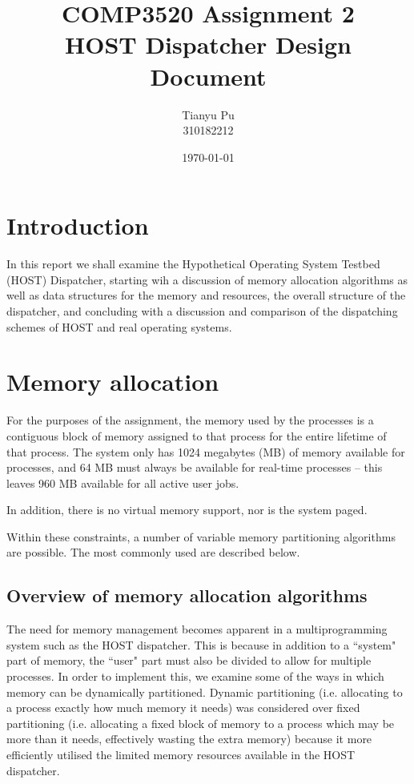 \documentclass[12pt]{article}
\title{COMP3520 Assignment 2\\
  HOST Dispatcher Design Document}
\author{Tianyu Pu\\
  310182212}
\date{\today}
\begin{document}
\maketitle

\section{Introduction}
In this report we shall examine the Hypothetical Operating System Testbed
(HOST) Dispatcher, starting wih a discussion of memory allocation
algorithms as well as data structures for the memory and resources, the overall
structure of the dispatcher, and concluding with a discussion and comparison
of the dispatching schemes of HOST and real operating systems.
\cite{stallings:2002}

\section{Memory allocation}
For the purposes of the assignment, the memory used by the processes is a
contiguous block of memory assigned to that process for the entire lifetime of
that process. The system only has 1024 megabytes (MB) of memory available for
processes, and 64 MB must always be available for real-time processes -- this
leaves 960 MB available for all active user jobs.

In addition, there is no virtual memory support, nor is the system paged.

Within these constraints, a number of variable memory partitioning algorithms
are possible. The most commonly used are described below.

\subsection{Overview of memory allocation algorithms}
The need for memory management becomes apparent in a multiprogramming system
such as the HOST dispatcher. This is because in addition to a ``system" part
of memory, the ``user" part must also be divided to allow for multiple
processes. In order to implement this, we examine some of the ways in which
memory can be dynamically partitioned. Dynamic partitioning (i.e. allocating
to a process exactly how much memory it needs) was considered over
fixed partitioning (i.e. allocating a fixed block of memory to a process which
may be more than it needs, effectively wasting the extra memory) because it
more efficiently utilised the limited memory resources available in the HOST
dispatcher.
\end{document}
